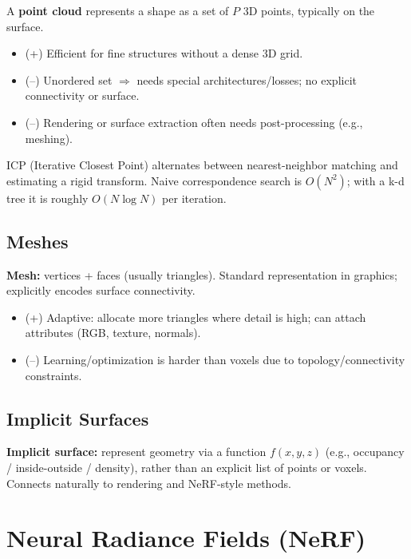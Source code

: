 \documentclass[11pt, oneside]{book}
\begin{document}
\begin{defbox}[title={Point Cloud}]
A \textbf{point cloud} represents a shape as a set of $P$ 3D points, typically on the surface.
\end{defbox}
\begin{itemize}
  \item (+) Efficient for fine structures without a dense 3D grid.
  \item (--) Unordered set $\Rightarrow$ needs special architectures/losses; no explicit connectivity or surface.
  \item (--) Rendering or surface extraction often needs post-processing (e.g., meshing).
\end{itemize}

ICP (Iterative Closest Point) alternates between nearest-neighbor matching and estimating a rigid transform.
Naive correspondence search is $O(N^2)$; with a k-d tree it is roughly $O(N\log N)$ per iteration.

\subsection{Meshes}

\begin{defbox}[title={Mesh}]
\textbf{Mesh:} vertices + faces (usually triangles). Standard representation in graphics; explicitly encodes surface connectivity.
\end{defbox}
\begin{itemize}
  \item (+) Adaptive: allocate more triangles where detail is high; can attach attributes (RGB, texture, normals).
  \item (--) Learning/optimization is harder than voxels due to topology/connectivity constraints.
\end{itemize}

\subsection{Implicit Surfaces}

\begin{defbox}[title={Implicit Surface}]
\textbf{Implicit surface:} represent geometry via a function $f(x,y,z)$ (e.g., occupancy / inside-outside / density),
rather than an explicit list of points or voxels. Connects naturally to rendering and NeRF-style methods.
\end{defbox}

\section{Neural Radiance Fields (NeRF)}
\end{document}
